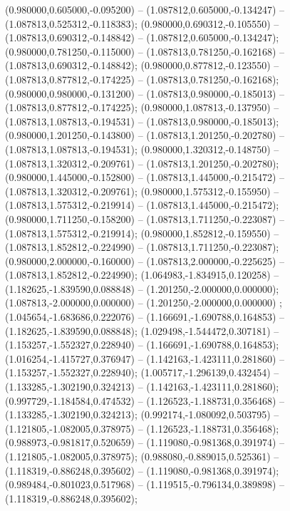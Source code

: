  (0.980000,0.605000,-0.095200) -- (1.087812,0.605000,-0.134247) -- (1.087813,0.525312,-0.118383);
 (0.980000,0.690312,-0.105550) -- (1.087813,0.690312,-0.148842) -- (1.087812,0.605000,-0.134247);
 (0.980000,0.781250,-0.115000) -- (1.087813,0.781250,-0.162168) -- (1.087813,0.690312,-0.148842);
 (0.980000,0.877812,-0.123550) -- (1.087813,0.877812,-0.174225) -- (1.087813,0.781250,-0.162168);
 (0.980000,0.980000,-0.131200) -- (1.087813,0.980000,-0.185013) -- (1.087813,0.877812,-0.174225);
 (0.980000,1.087813,-0.137950) -- (1.087813,1.087813,-0.194531) -- (1.087813,0.980000,-0.185013);
 (0.980000,1.201250,-0.143800) -- (1.087813,1.201250,-0.202780) -- (1.087813,1.087813,-0.194531);
 (0.980000,1.320312,-0.148750) -- (1.087813,1.320312,-0.209761) -- (1.087813,1.201250,-0.202780);
 (0.980000,1.445000,-0.152800) -- (1.087813,1.445000,-0.215472) -- (1.087813,1.320312,-0.209761);
 (0.980000,1.575312,-0.155950) -- (1.087813,1.575312,-0.219914) -- (1.087813,1.445000,-0.215472);
 (0.980000,1.711250,-0.158200) -- (1.087813,1.711250,-0.223087) -- (1.087813,1.575312,-0.219914);
 (0.980000,1.852812,-0.159550) -- (1.087813,1.852812,-0.224990) -- (1.087813,1.711250,-0.223087);
 (0.980000,2.000000,-0.160000) -- (1.087813,2.000000,-0.225625) -- (1.087813,1.852812,-0.224990);
 (1.064983,-1.834915,0.120258) -- (1.182625,-1.839590,0.088848) -- (1.201250,-2.000000,0.000000);
 (1.087813,-2.000000,0.000000) -- (1.201250,-2.000000,0.000000) ;
 (1.045654,-1.683686,0.222076) -- (1.166691,-1.690788,0.164853) -- (1.182625,-1.839590,0.088848);
 (1.029498,-1.544472,0.307181) -- (1.153257,-1.552327,0.228940) -- (1.166691,-1.690788,0.164853);
 (1.016254,-1.415727,0.376947) -- (1.142163,-1.423111,0.281860) -- (1.153257,-1.552327,0.228940);
 (1.005717,-1.296139,0.432454) -- (1.133285,-1.302190,0.324213) -- (1.142163,-1.423111,0.281860);
 (0.997729,-1.184584,0.474532) -- (1.126523,-1.188731,0.356468) -- (1.133285,-1.302190,0.324213);
 (0.992174,-1.080092,0.503795) -- (1.121805,-1.082005,0.378975) -- (1.126523,-1.188731,0.356468);
 (0.988973,-0.981817,0.520659) -- (1.119080,-0.981368,0.391974) -- (1.121805,-1.082005,0.378975);
 (0.988080,-0.889015,0.525361) -- (1.118319,-0.886248,0.395602) -- (1.119080,-0.981368,0.391974);
 (0.989484,-0.801023,0.517968) -- (1.119515,-0.796134,0.389898) -- (1.118319,-0.886248,0.395602);
